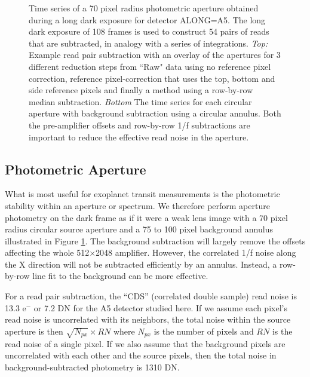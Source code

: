 \documentclass[]{aastex62}
\begin{document}
\begin{figure}[!hbtp]
\caption{Time series of a 70 pixel radius photometric aperture obtained during a long dark exposure for detector ALONG=A5. The long dark exposure of 108 frames is used to construct 54 pairs of reads that are subtracted, in analogy with a series of integrations.
{\it Top:}  Example read pair subtraction with an overlay of the apertures for 3 different reduction steps from ``Raw" data using no reference pixel correction, reference pixel-correction that uses the top, bottom and side reference pixels and finally a method using a row-by-row median subtraction.
{\it Bottom} The time series for each circular aperture with background subtraction using a circular annulus.
Both the pre-amplifier offsets and row-by-row 1/f subtractions are important to reduce the effective read noise in the aperture.
}\label{fig:longDarkPhot}
\end{figure}

\subsection{Photometric Aperture}\label{sec:photApertureDark}

What is most useful for exoplanet transit measurements is the photometric stability within an aperture or spectrum.
We therefore perform aperture photometry on the dark frame as if it were a weak lens image with a 70 pixel radius circular source aperture and a 75 to 100 pixel background annulus illustrated in Figure \ref{fig:longDarkPhot}.
The background subtraction will largely remove the offsets affecting the whole 512$\times$2048 amplifier.
However, the correlated 1/f noise along the X direction will not be subtracted efficiently by an annulus.
Instead, a row-by-row line fit to the background can be more effective.

For a read pair subtraction, the ``CDS'' (correlated double sample) read noise is 13.3 e$^-$ or 7.2 DN for the A5 detector studied here.
If we assume each pixel's read noise is uncorrelated with its neighbors, the total noise within the source aperture is then $\sqrt{N_{px}} \times RN $ where $N_{px}$ is the number of pixels and $RN$ is the read noise of a single pixel.
If we also assume that the background pixels are uncorrelated with each other and the source pixels, then the total noise in background-subtracted photometry is 1310 DN.
\end{document}
